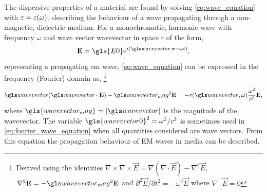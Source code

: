 \documentclass{article}
\begin{document}
The dispersive properties of a material are found by solving \eqref{eq:wave_equation} with $\varepsilon=\varepsilon(\omega)$, describing the behaviour of a wave propagating through a non-magnetic, dielectric medium. For a monochromatic, harmonic wave with frequency $\omega$ and wave vector \gls{wavevector} in space \gls{r} of the form,
\begin{equation}
	\vec{E} = \gls{E0} \e^{i(\wv \cdot \vec{r} - \omega t)},
	\label{eq:wave}
\end{equation}
representing a propagating \gls{em} wave, \eqref{eq:wave_equation} can be expressed in the frequency (Fourier) domain as,%
\footnote{Derived using the identities $\nabla \times \nabla \times \vec{E} = \nabla(\nabla\cdot\vec{E}) - \nabla^2\vec{E}$, $\nabla^2\vec{E}=-\wvm^2\vec{E}$ and $\partial^2\vec{E}/\partial t^2 = -\omega^2\vec{E}$ where $\nabla\cdot\vec{E}=0$}
\begin{equation}
	\wv(\wv\cdot\vec{E}) - \wvm^2\vec{E} = -\eps(\wv, \omega) \frac{\omega^2}{c^2}\vec{E},
	\label{eq:fourier_wave_equation}
\end{equation}
where $\gls{wavevector_mag}=|\wv|$ is the magnitude of the wavevector. The variable $\gls{wavevector0}^2 = \omega^2/c^2$ is sometimes used in \eqref{eq:fourier_wave_equation} when all quantities considered are wave vectors. From this equation the propagation behaviour of EM waves in media can be described.
\end{document}
